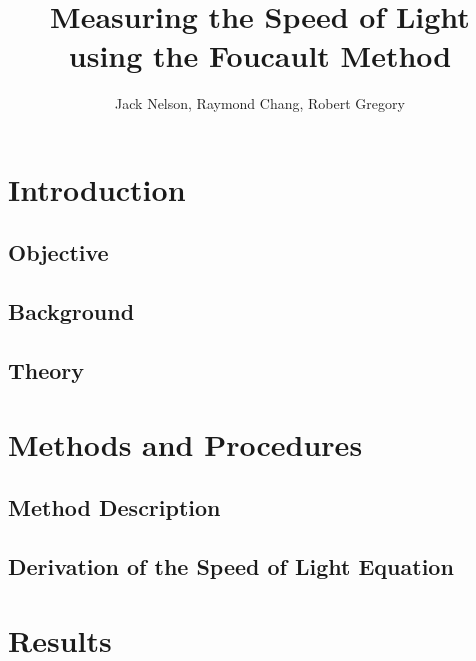 \documentclass[twocolumn]{article}
\begin{document}
	
\title{Measuring the Speed of Light using the Foucault Method}
\author{Jack Nelson, Raymond Chang, Robert Gregory}

\maketitle

\begin{abstract}

\end{abstract}

\section{Introduction}
	\subsection{Objective}
	\subsection{Background}
	\subsection{Theory}

\section{Methods and Procedures}
	\subsection{Method Description}
	\subsection{Derivation of the Speed of Light Equation}

\section{Results}
\end{document}
